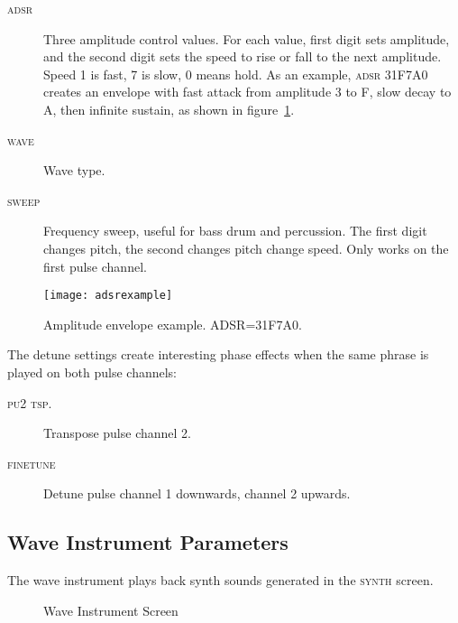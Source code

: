 \label{pulse-adsr}
\begin{description}
	\item[\textsc{adsr}] Three amplitude control values. For each value, first digit sets amplitude, and the second digit sets the speed to rise or fall to the next amplitude. Speed 1 is fast, 7 is slow, 0 means hold. As an example, \textsc{adsr} 31F7A0 creates an envelope 
 with fast attack from amplitude 3 to F, slow decay to A, then infinite sustain, as shown in figure~\ref{fig:adsrexample}.
	\item[\textsc{wave}] Wave type.
	\item[\textsc{sweep}] Frequency sweep, useful for bass drum and percussion. The first digit changes pitch, the second changes pitch change speed. Only works on the first pulse channel. 
\end{description}

\begin{figure}[hbtp]
\centering
\texttt{[image: adsrexample]} 
\caption{Amplitude envelope example. ADSR=31F7A0.}
\label{fig:adsrexample}
\end{figure}

The detune settings create interesting phase effects when the same phrase is played on both pulse channels:

\begin{description}
	\item[\textsc{pu2 tsp.}] Transpose pulse channel 2.
	\item[\textsc{finetune}] Detune pulse channel 1 downwards, channel 2 upwards.
\end{description}

\subsection{Wave Instrument Parameters}

The wave instrument plays back synth sounds generated in the \textsc{synth} screen.

\begin{figure}[hbtp]
	\begin{center}
	\end{center}
	\caption{Wave Instrument Screen}
\end{figure}


